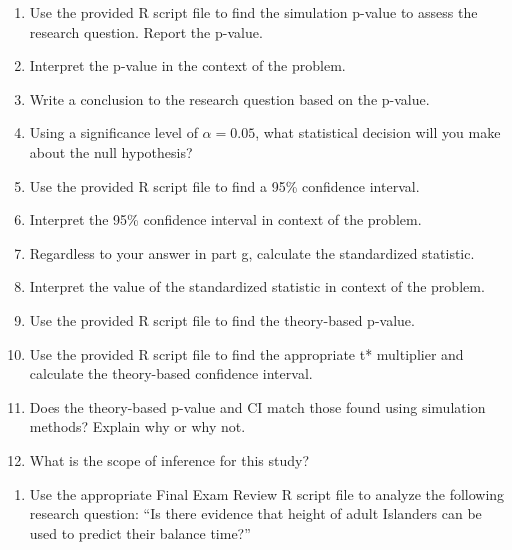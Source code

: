 \documentclass[
]{report}
\providecommand{\tightlist}{%
  \setlength{\itemsep}{0pt}\setlength{\parskip}{0pt}}
\begin{document}
\vspace{0.8in}

\begin{enumerate}
\def\labelenumi{\alph{enumi}.}
\setcounter{enumi}{7}
\item
  Use the provided R script file to find the simulation p-value to assess the research question. Report the p-value.
  \vspace{0.3in}
\item
  Interpret the p-value in the context of the problem.
  \vspace{0.8in}
\item
  Write a conclusion to the research question based on the p-value.
  \vspace{0.8in}
\item
  Using a significance level of \(\alpha = 0.05\), what statistical decision will you make about the null hypothesis?
  \vspace{0.3in}
\item
  Use the provided R script file to find a 95\% confidence interval.
  \vspace{0.3in}
\item
  Interpret the 95\% confidence interval in context of the problem.
  \vspace{0.8in}
\item
  Regardless to your answer in part g, calculate the standardized statistic.
  \vspace{0.4in}
\item
  Interpret the value of the standardized statistic in context of the problem.
  \vspace{0.8in}
\item
  Use the provided R script file to find the theory-based p-value.
  \vspace{0.3in}
\item
  Use the provided R script file to find the appropriate t* multiplier and calculate the theory-based confidence interval.
  \vspace{0.5in}
\item
  Does the theory-based p-value and CI match those found using simulation methods? Explain why or why not.
  \vspace{0.8in}
\item
  What is the scope of inference for this study?
  \vspace{0.8in}
\end{enumerate}

\newpage

\begin{enumerate}
\def\labelenumi{\arabic{enumi}.}
\setcounter{enumi}{3}
\tightlist
\item
  Use the appropriate Final Exam Review R script file to analyze the following research question: ``Is there evidence that height of adult Islanders can be used to predict their balance time?''
\end{enumerate}
\end{document}
